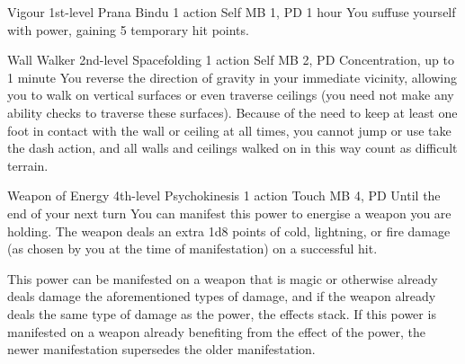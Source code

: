 \DndPowerHeader%
  {Vigour}
  {1st-level Prana Bindu}
  {1 action}
  {Self}
  {MB 1, PD \lvlone}
  {1 hour}
You suffuse yourself with power,
gaining 5 temporary hit points.

\DndPowerHeader%
  {Wall Walker}
  {2nd-level Spacefolding}
  {1 action}
  {Self}
  {MB 2, PD \lvltwo}
  {Concentration, up to 1 minute}
  You reverse the direction of gravity in your immediate vicinity,
  allowing you to walk on vertical surfaces
  or even traverse ceilings
  (you need not make any ability checks to traverse these surfaces).
  Because of the need to keep at least one foot in contact
  with the wall or ceiling at all times,
  you cannot jump or use take the dash action,
  and all walls and ceilings walked on in this way count as
  difficult terrain.

\DndPowerHeader%
  {Weapon of Energy}
  {4th-level Psychokinesis}
  {1 action}
  {Touch}
  {MB 4, PD \lvlfour}
  {Until the end of your next turn}
  You can manifest this power to
  energise a weapon you are holding.
  The weapon deals an extra 1d8 points of cold,
  lightning, or fire damage
  (as chosen by you at the time of manifestation)
  on a successful hit.

  This power can be manifested on a weapon that
  is magic or otherwise already deals damage the
  aforementioned types of damage,
  and if the weapon already deals the same type of damage
  as the power,
  the effects stack.
  If this power is manifested on a weapon
  already benefiting from the effect of the power,
  the newer manifestation supersedes the older manifestation.
